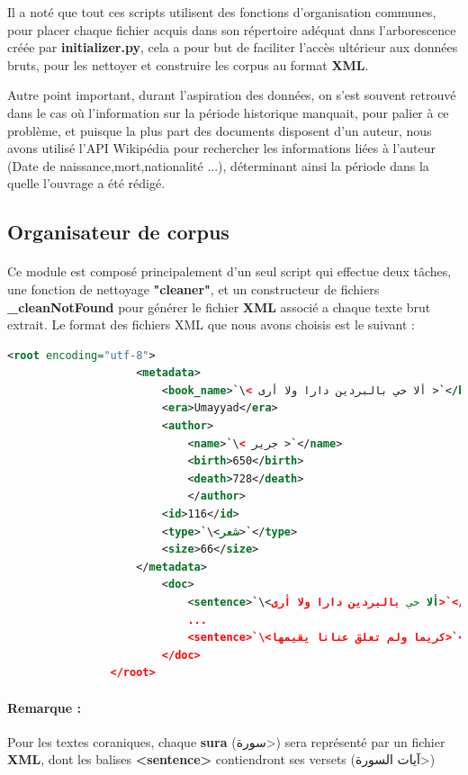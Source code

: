\documentclass[]{report}
\begin{document}
			\par 
			Il a noté que tout ces scripts utilisent des fonctions d'organisation communes, pour placer chaque fichier acquis dans son répertoire adéquat dans l'arborescence créée par \textbf{initializer.py}, cela a pour but de faciliter l'accès ultérieur aux données bruts, pour les nettoyer et construire les corpus au format \textbf{XML}.
			\par 
			Autre point important, durant l'aspiration des données, on s'est souvent retrouvé dans le cas où l'information sur la période historique manquait, pour palier à ce problème, et puisque la plus part des documents disposent d'un auteur, nous avons utilisé l'API Wikipédia pour rechercher les informations liées à l'auteur (Date de naissance,mort,nationalité ...), déterminant ainsi la période dans la quelle l'ouvrage a été rédigé.
			 
		\subsection{Organisateur de corpus}
			\paragraph{}
			Ce module est composé principalement d'un seul script qui effectue deux tâches, une fonction de nettoyage \textbf{"cleaner"}, et un constructeur de fichiers \textbf{\_cleanNotFound} pour générer le fichier \textbf{XML} associé a chaque texte brut extrait.
			Le format des fichiers XML que nous avons choisis est le suivant : 
			
			
			\begin{lstlisting}[language=XML]
			 	<root encoding="utf-8">
				 	<metadata>
					 	<book_name>`\< ألا حي بالبردين دارا ولا أرى >`</book_name>
					 	<era>Umayyad</era>
					 	<author>
						 	<name>`\< جرير >`</name>
						 	<birth>650</birth>
						 	<death>728</death>
						 	</author>
					 	<id>116</id>
					 	<type>`\<شعر>`</type>
					 	<size>66</size>
				 	</metadata>
					 	<doc>
						 	<sentence>`\<ألا حي بالبردين دارا ولا أرى>`</sentence>
						 	...
						 	<sentence>`\<كريما ولم تعلق عنانا يقيمها>`</sentence>
					 	</doc>
			 	</root>
			\end{lstlisting}
			
			\paragraph{Remarque : }
			Pour les textes coraniques, chaque \textbf{sura} (\<سورة>) sera représenté par un fichier \textbf{XML}, dont les balises 	\textbf{<sentence>} contiendront ses versets (\<آيات السورة>)
			
\end{document}
